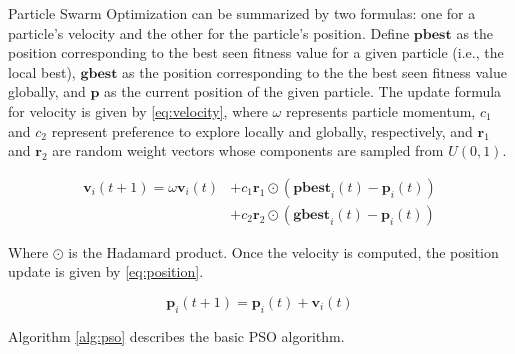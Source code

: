 Particle Swarm Optimization can be summarized by two formulas:
one for a particle's velocity and the other for the particle's position. Define
$\textbf{pbest}$ as the position corresponding to the best seen fitness value
for a given particle (i.e., the local best), $\textbf{gbest}$ as the position
corresponding to the the best seen fitness value globally, and $\textbf{p}$ as
the current position of the given particle. The update formula for velocity is
given by \eqref{eq:velocity}, where $\omega$ represents particle momentum,
$c_1$ and $c_2$ represent preference to explore locally and globally,
respectively, and $\textbf{r}_1$ and $\textbf{r}_2$ are random weight vectors whose components are
sampled from $U(0, 1)$.


\begin{equation}\label{eq:velocity}
\begin{aligned}
  \textbf{v}_i(t+1) = \omega \textbf{v}_i (t) & +
                                                c_1 \textbf{r}_1\odot (\textbf{pbest}_i(t) -
                                                \textbf{p}_i(t))
  \\
  &+ c_2 \textbf{r}_2 \odot(\textbf{gbest}_i(t) - \textbf{p}_i(t))
\end{aligned}
\end{equation}

Where $\odot$ is the Hadamard product.
Once the velocity is computed, the position update is given by
\eqref{eq:position}.

\begin{equation}\label{eq:position}
  \textbf{p}_i(t+1) = \textbf{p}_i(t) + \textbf{v}_i(t)
\end{equation}

% 
Algorithm \ref{alg:pso} describes the basic PSO algorithm.

